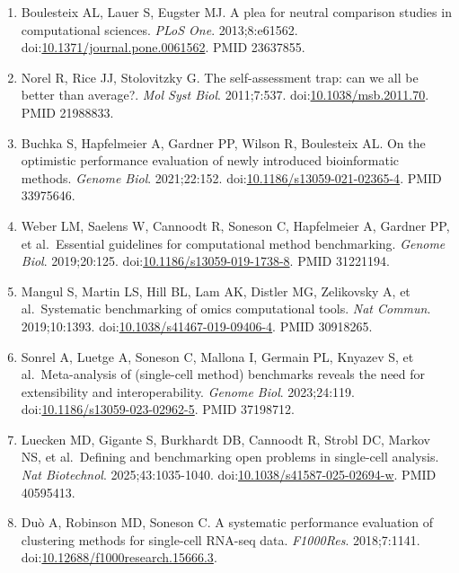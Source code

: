 \documentclass[11pt]{article}
\providecommand{\tightlist}{\setlength{\itemsep}{0pt}\setlength{\parskip}{0pt}}
\begin{document}
\begin{enumerate}
\def\labelenumi{\arabic{enumi}.}
\tightlist
\item
  Boulesteix AL, Lauer S, Eugster MJ. A plea for neutral comparison
  studies in computational sciences. \emph{PLoS One}. 2013;8:e61562.
  doi:\href{https://doi.org/10.1371/journal.pone.0061562}{10.1371/journal.pone.0061562}.
  PMID 23637855.
\item
  Norel R, Rice JJ, Stolovitzky G. The self-assessment trap: can we all
  be better than average?. \emph{Mol Syst Biol}. 2011;7:537.
  doi:\href{https://doi.org/10.1038/msb.2011.70}{10.1038/msb.2011.70}.
  PMID 21988833.
\item
  Buchka S, Hapfelmeier A, Gardner PP, Wilson R, Boulesteix AL. On the
  optimistic performance evaluation of newly introduced bioinformatic
  methods. \emph{Genome Biol}. 2021;22:152.
  doi:\href{https://doi.org/10.1186/s13059-021-02365-4}{10.1186/s13059-021-02365-4}.
  PMID 33975646.
\item
  Weber LM, Saelens W, Cannoodt R, Soneson C, Hapfelmeier A, Gardner PP,
  et al.~Essential guidelines for computational method benchmarking.
  \emph{Genome Biol}. 2019;20:125.
  doi:\href{https://doi.org/10.1186/s13059-019-1738-8}{10.1186/s13059-019-1738-8}.
  PMID 31221194.
\item
  Mangul S, Martin LS, Hill BL, Lam AK, Distler MG, Zelikovsky A, et
  al.~Systematic benchmarking of omics computational tools. \emph{Nat
  Commun}. 2019;10:1393.
  doi:\href{https://doi.org/10.1038/s41467-019-09406-4}{10.1038/s41467-019-09406-4}.
  PMID 30918265.
\item
  Sonrel A, Luetge A, Soneson C, Mallona I, Germain PL, Knyazev S, et
  al.~Meta-analysis of (single-cell method) benchmarks reveals the need
  for extensibility and interoperability. \emph{Genome Biol}.
  2023;24:119.
  doi:\href{https://doi.org/10.1186/s13059-023-02962-5}{10.1186/s13059-023-02962-5}.
  PMID 37198712.
\item
  Luecken MD, Gigante S, Burkhardt DB, Cannoodt R, Strobl DC, Markov NS,
  et al.~Defining and benchmarking open problems in single-cell
  analysis. \emph{Nat Biotechnol}. 2025;43:1035-1040.
  doi:\href{https://doi.org/10.1038/s41587-025-02694-w}{10.1038/s41587-025-02694-w}.
  PMID 40595413.
\item
  Duò A, Robinson MD, Soneson C. A systematic performance evaluation of
  clustering methods for single-cell RNA-seq data. \emph{F1000Res}.
  2018;7:1141.
  doi:\href{https://doi.org/10.12688/f1000research.15666.3}{10.12688/f1000research.15666.3}.

\end{enumerate}
\end{document}
